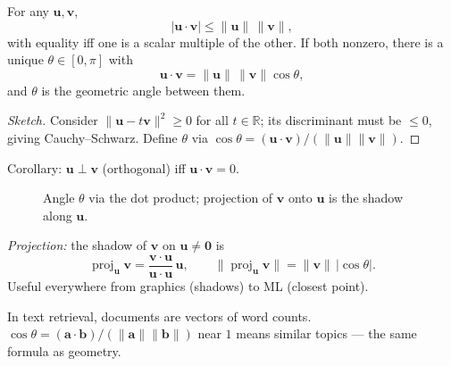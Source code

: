 \begin{theorem}
For any $\mathbf{u},\mathbf{v}$,
\[
  |\mathbf{u}\cdot\mathbf{v}|\le\|\mathbf{u}\|\,\|\mathbf{v}\|,
\]
with equality iff one is a scalar multiple of the other. If both nonzero, there is a unique $\theta\in[0,\pi]$ with
\[
  \mathbf{u}\cdot\mathbf{v}=\|\mathbf{u}\|\,\|\mathbf{v}\|\cos\theta,
\]
and $\theta$ is the geometric angle between them.
\end{theorem}
\begin{proof}[Sketch]
Consider $\|\mathbf{u}-t\mathbf{v}\|^2\ge0$ for all $t\in\mathbb{R}$; its discriminant must be $\le0$, giving Cauchy--Schwarz. Define $\theta$ via $\cos\theta=(\mathbf{u}\cdot\mathbf{v})/(\|\mathbf{u}\|\|\mathbf{v}\|)$.
\end{proof}

Corollary: $\mathbf{u}\perp\mathbf{v}$ (orthogonal) iff $\mathbf{u}\cdot\mathbf{v}=0$.

\begin{figure}[h]
\centering
{}
\caption{Angle $\theta$ via the dot product; projection of $\mathbf{v}$ onto $\mathbf{u}$ is the shadow along $\mathbf{u}$.}
\label{fig:angle-proj}
\end{figure}

\emph{Projection:} the shadow of $\mathbf{v}$ on $\mathbf{u}\neq\mathbf{0}$ is
\[
  \operatorname{proj}_{\mathbf{u}}\mathbf{v}=\frac{\mathbf{v}\cdot\mathbf{u}}{\mathbf{u}\cdot\mathbf{u}}\,\mathbf{u},\qquad
  \|\operatorname{proj}_{\mathbf{u}}\mathbf{v}\|= \|\mathbf{v}\|\,|\cos\theta|.
\]
Useful everywhere from graphics (shadows) to ML (closest point).

\begin{example}
In text retrieval, documents are vectors of word counts. $\cos\theta=(\mathbf{a}\cdot\mathbf{b})/(\|\mathbf{a}\|\|\mathbf{b}\|)$ near $1$ means similar topics --- the same formula as geometry.
\end{example}

